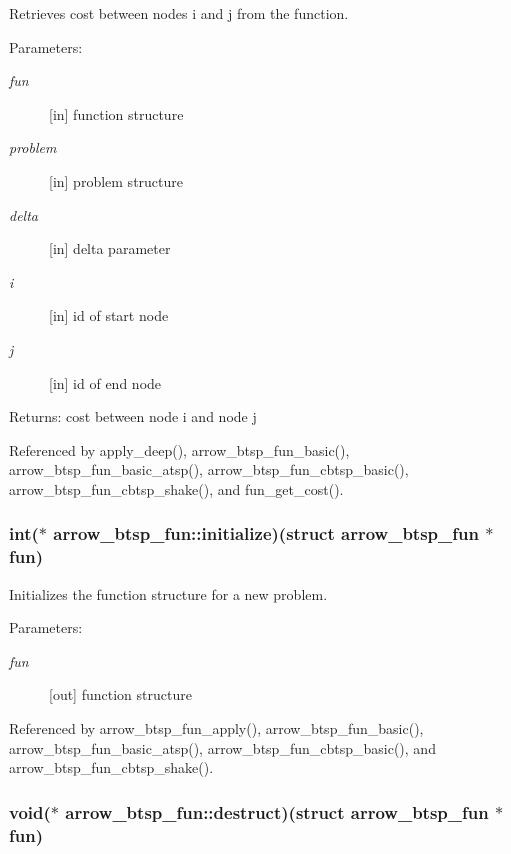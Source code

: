 Retrieves cost between nodes i and j from the function. 

\begin{Desc}
\item[Parameters:]
\begin{description}
\item[{\em fun}]\mbox{[}in\mbox{]} function structure \item[{\em problem}]\mbox{[}in\mbox{]} problem structure \item[{\em delta}]\mbox{[}in\mbox{]} delta parameter \item[{\em i}]\mbox{[}in\mbox{]} id of start node \item[{\em j}]\mbox{[}in\mbox{]} id of end node \end{description}
\end{Desc}
\begin{Desc}
\item[Returns:]cost between node i and node j \end{Desc}


Referenced by apply\_\-deep(), arrow\_\-btsp\_\-fun\_\-basic(), arrow\_\-btsp\_\-fun\_\-basic\_\-atsp(), arrow\_\-btsp\_\-fun\_\-cbtsp\_\-basic(), arrow\_\-btsp\_\-fun\_\-cbtsp\_\-shake(), and fun\_\-get\_\-cost().\hypertarget{structarrow__btsp__fun_c588686921bd526653a7e0d7816aee44}{
\subsubsection{\setlength{\rightskip}{0pt plus 5cm}int($\ast$ {\bf arrow\_\-btsp\_\-fun::initialize})(struct {\bf arrow\_\-btsp\_\-fun} $\ast$fun)}}
\label{structarrow__btsp__fun_c588686921bd526653a7e0d7816aee44}


Initializes the function structure for a new problem. 

\begin{Desc}
\item[Parameters:]
\begin{description}
\item[{\em fun}]\mbox{[}out\mbox{]} function structure \end{description}
\end{Desc}


Referenced by arrow\_\-btsp\_\-fun\_\-apply(), arrow\_\-btsp\_\-fun\_\-basic(), arrow\_\-btsp\_\-fun\_\-basic\_\-atsp(), arrow\_\-btsp\_\-fun\_\-cbtsp\_\-basic(), and arrow\_\-btsp\_\-fun\_\-cbtsp\_\-shake().\hypertarget{structarrow__btsp__fun_6c66b7591252728aaa441139c623446a}{
\subsubsection{\setlength{\rightskip}{0pt plus 5cm}void($\ast$ {\bf arrow\_\-btsp\_\-fun::destruct})(struct {\bf arrow\_\-btsp\_\-fun} $\ast$fun)}}
\label{structarrow__btsp__fun_6c66b7591252728aaa441139c623446a}


